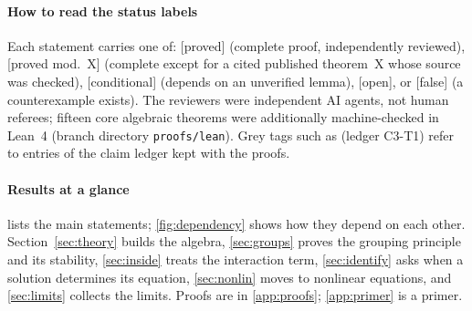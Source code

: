 \documentclass[11pt]{article}
\theoremstyle{plain}
\theoremstyle{definition}
\theoremstyle{remark}
\newcommand{\badge}[2]{\textcolor{#1}{\textsf{\footnotesize[#2]}}}
\newcommand{\proved}[1][]{\badge{cC}{proved#1}}
\newcommand{\modulo}[1]{\badge{cD}{proved mod.\ #1}}
\newcommand{\condl}{\badge{cD}{conditional}}
\newcommand{\openq}{\badge{cB}{open}}
\newcommand{\falsest}{\badge{cB}{false}}
\newcommand{\led}[1]{\textcolor{cG}{\textsf{\footnotesize(ledger #1)}}}
\begin{document}


\paragraph{How to read the status labels} Each statement carries one of: \proved{} (complete proof, independently reviewed), \modulo{X} (complete except for a cited published theorem~X whose source was checked), \condl{} (depends on an unverified lemma),
\openq{}, or \falsest{} (a counterexample exists). The reviewers were independent AI agents, not human referees; fifteen core algebraic theorems were additionally machine-checked in Lean~4 (branch directory \texttt{proofs/lean}). Grey tags such as \led{C3-T1}
refer to entries of the claim ledger kept with the proofs.

\paragraph{Results at a glance}  lists the main statements; \cref{fig:dependency} shows how they depend on each other. Section~\ref{sec:theory} builds the algebra, \cref{sec:groups} proves the grouping principle and its stability,
\cref{sec:inside} treats the interaction term, \cref{sec:identify} asks when a solution determines its equation, \cref{sec:nonlin} moves to nonlinear equations, and \cref{sec:limits} collects the limits. Proofs are in \cref{app:proofs}; \cref{app:primer} is a primer.
\end{document}
